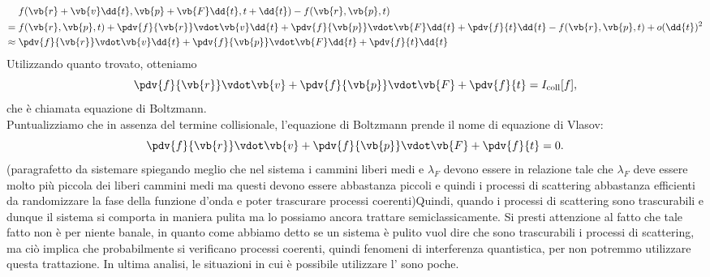 \begin{equation*}
    \begin{split}
        & \hspace{0.1cm} f(\vb{r} + \vb{v} \dd{t}, \vb{p} + \vb{F} \dd{t}, t + \dd{t}) - f(\vb{r}, \vb{p}, t)
        \\
        = & \hspace{0.1cm} f(\vb{r}, \vb{p}, t) + \pdv{f}{\vb{r}} \vdot \vb{v} \dd{t} + \pdv{f}{\vb{p}} \vdot \vb{F} \dd{t} + \pdv{f}{t} \dd{t} - f(\vb{r}, \vb{p}, t) +o{(\dd{t})^2}
        \\
        \approx & \hspace{0.1cm} \pdv{f}{\vb{r}} \vdot \vb{v} \dd{t} + \pdv{f}{\vb{p}} \vdot \vb{F} \dd{t} + \pdv{f}{t} \dd{t}
    \end{split}
\end{equation*}
Utilizzando quanto trovato, otteniamo
\begin{equation}
    \pdv{f}{\vb{r}} \vdot \vb{v} + \pdv{f}{\vb{p}} \vdot \vb{F} + \pdv{f}{t}
    =I_{\rm coll}[f],
    \label{eq:equazione_di_Boltzmann}
\end{equation}
che è chiamata equazione di Boltzmann.\\
Puntualizziamo che in assenza del termine collisionale, l'equazione di Boltzmann prende il nome di equazione di Vlasov:
\begin{equation}
    \pdv{f}{\vb{r}} \vdot \vb{v} + \pdv{f}{\vb{p}} \vdot \vb{F} + \pdv{f}{t}
    =0.
    \label{eq:equazione_di_Vlasov}
\end{equation}
(paragrafetto da sistemare spiegando meglio che nel sistema i cammini liberi medi e $\lambda_F$ devono essere in relazione tale che $\lambda_F$ deve essere molto più piccola dei liberi cammini medi ma questi devono essere abbastanza piccoli e quindi i processi di scattering abbastanza efficienti da randomizzare la fase della funzione d'onda e poter trascurare processi coerenti)Quindi, quando i processi di scattering sono trascurabili e dunque il sistema si comporta in maniera pulita ma lo possiamo ancora trattare semiclassicamente. Si presti attenzione al fatto che tale fatto non è per niente banale, in quanto come abbiamo detto se un sistema è pulito vuol dire che sono trascurabili i processi di scattering, ma ciò implica che probabilmente si verificano processi coerenti, quindi fenomeni di interferenza quantistica, per non potremmo utilizzare questa trattazione. In ultima analisi, le situazioni in cui è possibile utilizzare l' sono poche.\\
